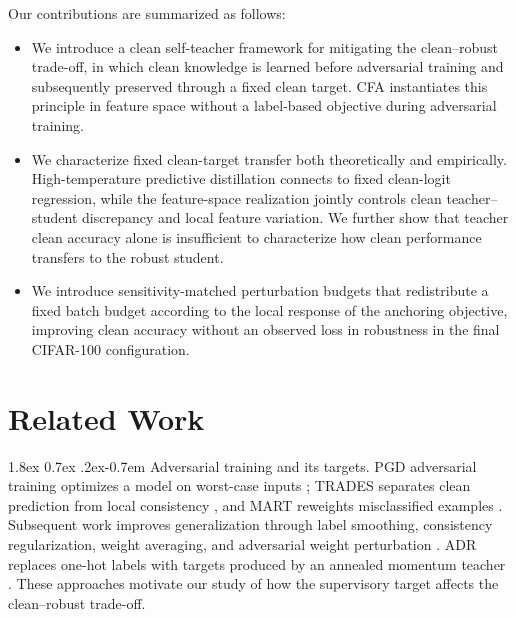 \documentclass{article} %
\makeatletter
\theoremstyle{plain}
\renewcommand{\paragraph}{\@startsection{paragraph}{4}{\z@}%
  {1.8ex \@plus 0.7ex \@minus .2ex}{-0.7em}%
  {\normalfont\normalsize\bfseries}}
\makeatother
\begin{document}
Our contributions are summarized as follows:
\begin{itemize}

  \item We introduce a clean self-teacher framework for mitigating the
  clean--robust trade-off, in which clean knowledge is learned before
  adversarial training and subsequently preserved through a fixed clean
  target. CFA instantiates this principle in feature space without a
  label-based objective during adversarial training.

  \item We characterize fixed clean-target transfer both theoretically and
  empirically. High-temperature predictive distillation connects to fixed
  clean-logit regression, while the feature-space realization jointly
  controls clean teacher--student discrepancy and local feature variation.
  We further show that teacher clean accuracy alone is insufficient to
  characterize how clean performance transfers to the robust student.

  \item We introduce sensitivity-matched perturbation budgets that
  redistribute a fixed batch budget according to the local response of the
  anchoring objective, improving clean accuracy without an observed loss in
  robustness in the final CIFAR-100 configuration.

\end{itemize}

\section{Related Work}
\label{sec:related}

\paragraph{Adversarial training and its targets.}
PGD adversarial training optimizes a model on worst-case inputs \citep{PGD}; TRADES separates clean
prediction from local consistency \citep{TRADES}, and MART reweights misclassified examples
\citep{MART}. Subsequent work improves generalization through label smoothing, consistency
regularization, weight averaging, and adversarial weight perturbation
\citep{pang2020bag,tack2022consistency,robustoverfit,2020_awp}. ADR replaces one-hot labels with
targets produced by an annealed momentum teacher \citep{adr}. These approaches motivate our study
of how the supervisory target affects the clean--robust trade-off.
\end{document}
